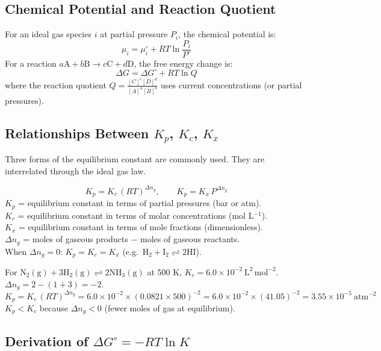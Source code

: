 \documentclass[12pt,a4paper]{article}
\begin{document}
\subsection{Chemical Potential and Reaction Quotient}
For an ideal gas species $i$ at partial pressure $P_i$, the chemical potential is:
\[
\mu_i = \mu_i^\circ + RT\ln\frac{P_i}{P^\circ}
\]
For a reaction $a\mathrm{A} + b\mathrm{B} \to c\mathrm{C} + d\mathrm{D}$, the free energy change is:
\[
\Delta G = \Delta G^\circ + RT\ln Q
\]
where the reaction quotient $Q = \frac{[C]^c[D]^d}{[A]^a[B]^b}$ uses current concentrations (or partial pressures).

\subsection{Relationships Between \texorpdfstring{$K_p$, $K_c$, $K_x$}{Kp, Kc, Kx}}
Three forms of the equilibrium constant are commonly used. They are interrelated through the ideal gas law.

\begin{tcolorbox}[formulabox, title={Equilibrium Constant Relationships}]
\[
K_p = K_c\,(RT)^{\Delta n_g}, \qquad K_p = K_x\,P^{\Delta n_g}
\]
$K_p$ = equilibrium constant in terms of partial pressures (bar or atm).\\
$K_c$ = equilibrium constant in terms of molar concentrations (mol L$^{-1}$).\\
$K_x$ = equilibrium constant in terms of mole fractions (dimensionless).\\
$\Delta n_g$ = moles of gaseous products $-$ moles of gaseous reactants.\\
When $\Delta n_g = 0$: $K_p = K_c = K_x$ (e.g.\ $\mathrm{H_2 + I_2 \rightleftharpoons 2HI}$).
\end{tcolorbox}

\begin{tcolorbox}[examplebox, title={Solved Example: \texorpdfstring{$K_p$}{Kp} from \texorpdfstring{$K_c$}{Kc}}]
For $\mathrm{N_2(g) + 3H_2(g) \rightleftharpoons 2NH_3(g)}$ at 500 K, $K_c = 6.0\times10^{-2}\ \mathrm{L^2\,mol^{-2}}$.\\
$\Delta n_g = 2 - (1+3) = -2$.
\[
K_p = K_c\,(RT)^{\Delta n_g} = 6.0\times10^{-2}\times(0.0821\times500)^{-2}
= 6.0\times10^{-2}\times(41.05)^{-2} = 3.55\times10^{-5}\ \mathrm{atm^{-2}}
\]
$K_p < K_c$ because $\Delta n_g < 0$ (fewer moles of gas at equilibrium).
\end{tcolorbox}

\subsection{Derivation of \texorpdfstring{$\Delta G^\circ = -RT\ln K$}{Delta G0 = -RT ln K}}
\end{document}
